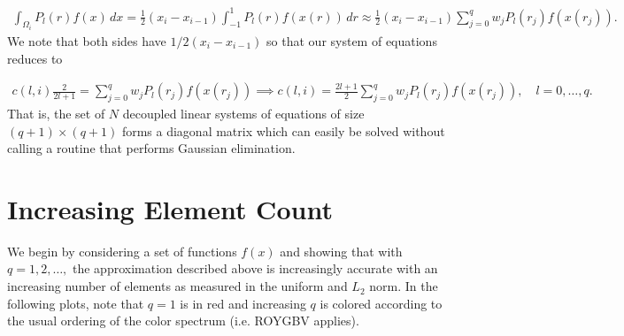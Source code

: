 \documentclass{article}
\begin{document}
  \begin{align*}
    \int_{\Omega_i} P_l(r) f(x) \, dx = \frac{1}{2} \left( x_i - x_{i-1}\right) \int_{-1}^1 P_l(r) f(x(r)) \, dr \approx \frac{1}{2} \left( x_i - x_{i-1}\right)\sum_{j=0}^q w_j P_l(r_j) f(x(r_j)).
  \end{align*}
We note that both sides have $1/2 \left( x_i - x_{i-1}\right)$ so that our system of equations reduces to 

  \begin{align*}
    c(l,i) \frac{2}{2l + 1} = \sum_{j=0}^q w_j P_l(r_j) f(x(r_j)) \implies c(l,i) = \frac{2l + 1}{2} \sum_{j=0}^q w_j P_l(r_j) f(x(r_j)), \quad l = 0,\dots, q .
  \end{align*}
That is, the set of $N$ decoupled linear systems of equations of size $(q+1)\times(q+1)$ forms a diagonal matrix which can easily be solved without calling a routine that performs Gaussian elimination.

\section{Increasing Element Count}
We begin by considering a set of functions $f(x)$ and showing that with $q=1,2,\dots,$ the approximation described above is increasingly accurate with an increasing number of elements as measured in the uniform and $L_2$ norm. In the following plots, note that $q = 1$ is in red and increasing $q$ is colored according to the usual ordering of the color spectrum (i.e. ROYGBV applies).
\end{document}
